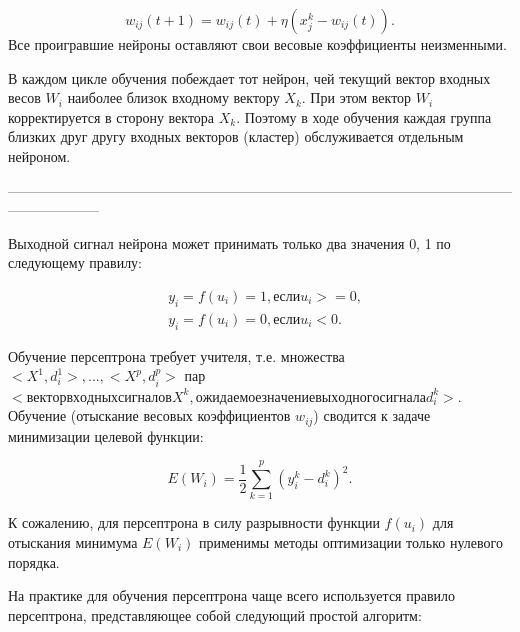 \begin{equation}\label{eq:minFunc}
    w_{ij}(t+1)=w_{ij}(t)+\eta(x_j^k-w_{ij}(t)).
\end{equation}
Все проигравшие нейроны оставляют свои весовые коэффициенты неизменными. 

В каждом цикле обучения побеждает тот нейрон, чей текущий вектор входных весов $W_i$ наиболее близок входному вектору $X_k$. При этом вектор $W_i$ корректируется в сторону вектора $X_k$. Поэтому в ходе обучения каждая группа близких друг другу входных векторов (кластер) обслуживается отдельным нейроном.


















--------------------------------------------------------------------------------------------------------------------------------


Выходной сигнал нейрона может принимать только два значения {0, 1} по следующему правилу:

\begin{equation}\label{eq:system}
		\begin{aligned}
  			& y_i = f(u_i)=1, если u_i>=0, \\
  			& y_i = f(u_i)=0, если u_i<0.
		\end{aligned}  		
\end{equation}


Обучение персептрона требует учителя, т.е. множества ${<X^1, d^1_i>, ..., <X^p, d^p_i>}$ пар $<вектор входных сигналов X^k, ожидаемое значение выходного сигнала d^k_i>$. Обучение (отыскание весовых коэффициентов $w_{ij}$) сводится к задаче минимизации целевой функции:

\begin{equation}\label{eq:minFunc}
	E(W_i)=\dfrac{1}{2}\sum\limits_{k=1}^p(y^k_i-d^k_i)^2.
\end{equation}

К сожалению, для персептрона в силу разрывности функции $f(u_i)$ для отыскания минимума $E(W_i)$ применимы методы оптимизации только нулевого порядка.

На практике для обучения персептрона чаще всего используется правило персептрона, представляющее собой следующий простой алгоритм:

